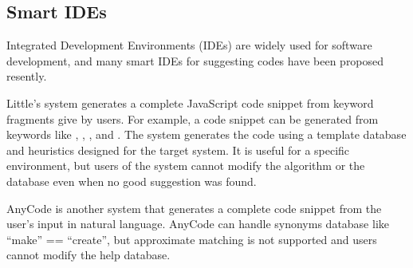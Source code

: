 \documentclass{sigchi}
\begin{document}
\subsection{Smart IDEs}

Integrated Development Environments (IDEs) are widely used for
software development, and
many smart IDEs for suggesting codes have been proposed resently.

Little's system\cite{Little:2006:TKC:1166253.1166275}
generates a complete JavaScript code snippet from keyword fragments
give by users.
For example, a code snippet
can be generated from keywords like
,
,
,
and .
The system generates the code using a template database and heuristics
designed for the target system.
It is useful for a specific environment, but
users of the system cannot modify the algorithm or the database
even when no good suggestion was found.


AnyCode\cite{Gvero:2015:SJE:2814270.2814295} is another system
that generates a complete code snippet from the user's
input in natural language.
AnyCode can handle synonyms database like ``make'' == ``create'',
but approximate matching is not supported and
users cannot modify the help database.


\end{document}
